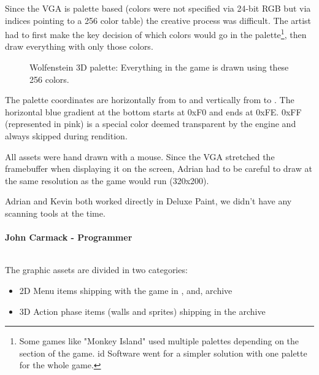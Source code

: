 \documentclass[book.tex]{subfiles}
\begin{document}
\par
Since the VGA is palette based (colors were not specified via 24-bit RGB but via indices pointing to a 256 color table) the creative process was difficult. The artist had to first make the key decision of which colors would go in the palette\footnote{Some games like "Monkey Island" used multiple palettes depending on the section of the game. id Software went for a simpler solution with one palette for the whole game.}, then draw everything with only those colors.\\
\begin{figure}[H]
  \centering
{}
 \caption{Wolfenstein 3D palette: Everything in the game is drawn using these 256 colors.}
\end{figure}
The palette coordinates are horizontally from  to  and vertically from  to . The horizontal blue gradient at the bottom starts at 0xF0 and ends at 0xFE. 0xFF (represented in pink) is a special color deemed transparent by the engine and always skipped during rendition.\\
\par

All assets were hand drawn with a mouse. Since the VGA stretched the framebuffer when displaying it on the screen, Adrian had to be careful to draw at the same resolution as the game would run (320x200).\\
\par
\begin{fancyquotes}
Adrian and Kevin both worked directly in Deluxe Paint, we didn't have any scanning tools at the time.\\
\\
\textbf{John Carmack - Programmer}
\end{fancyquotes}
\\
The graphic assets are divided in two categories:
\begin{itemize}
\item 2D Menu items shipping with the game in ,  and,  archive
\item 3D Action phase items (walls and sprites) shipping in the  archive
\end{itemize}
\end{document}
